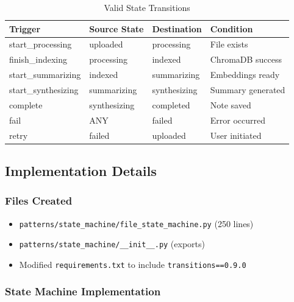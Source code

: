 \documentclass[11pt,a4paper]{article}
\begin{document}
\begin{table}[H]
\centering
\small
\begin{tabular}{|l|l|l|l|}
\hline
\textbf{Trigger} & \textbf{Source State} & \textbf{Destination} & \textbf{Condition} \\
\hline
start\_processing & uploaded & processing & File exists \\
finish\_indexing & processing & indexed & ChromaDB success \\
start\_summarizing & indexed & summarizing & Embeddings ready \\
start\_synthesizing & summarizing & synthesizing & Summary generated \\
complete & synthesizing & completed & Note saved \\
fail & ANY & failed & Error occurred \\
retry & failed & uploaded & User initiated \\
\hline
\end{tabular}
\caption{Valid State Transitions}
\end{table}

\subsection{Implementation Details}

\subsubsection{Files Created}

\begin{itemize}
    \item \texttt{patterns/state\_machine/file\_state\_machine.py} (250 lines)
    \item \texttt{patterns/state\_machine/\_\_init\_\_.py} (exports)
    \item Modified \texttt{requirements.txt} to include \texttt{transitions==0.9.0}
\end{itemize}

\subsubsection{State Machine Implementation}
\end{document}

